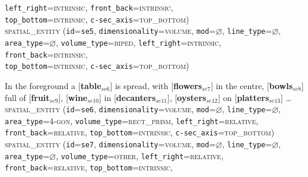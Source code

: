 \documentclass[11pt]{article}
\newcommand{\entity}[2]{[\textbf{\color{darkblue}#1}$_{se#2}$]}
\begin{document}
{            \texttt{left\_right}=\textsc{intrinsic},
            \texttt{front\_back}=\textsc{intrinsic},\\
            \texttt{top\_bottom}=\textsc{intrinsic},
            \texttt{c-sec\_axis}=\textsc{top\_bottom})\vspace{0.5em}\\
        \textsc{spatial\_entity}
            (\texttt{id}=\texttt{se5},
            \texttt{dimensionality}=\textsc{volume},
            \texttt{mod}=$\varnothing$,
            \texttt{line\_type}=$\varnothing$,\\
            \texttt{area\_type}=$\varnothing$,
            \texttt{volume\_type}=\textsc{biped},
            \texttt{left\_right}=\textsc{intrinsic},
            \texttt{front\_back}=\textsc{intrinsic},\\
            \texttt{top\_bottom}=\textsc{intrinsic},
            \texttt{c-sec\_axis}=\textsc{top\_bottom})        
        \label{ex:maurice_henriette}
    \item In the foreground a \entity{table}{6} is spread, with \entity{flowers}{7} in the centre, \entity{bowls}{8} full of \entity{fruit}{9}, \entity{wine}{10} in \entity{decanters}{11}, \entity{oysters}{12} on \entity{platters}{13} \ldots\vspace{0.5em}\\
        \textsc{spatial\_entity}
            (\texttt{id}=\texttt{se6},
            \texttt{dimensionality}=\textsc{volume},
            \texttt{mod}=$\varnothing$,
            \texttt{line\_type}=$\varnothing$,\\
            \texttt{area\_type}=\textsc{4-gon},
            \texttt{volume\_type}=\textsc{rect\_prism},
            \texttt{left\_right}=\textsc{relative},\\
            \texttt{front\_back}=\textsc{relative},
            \texttt{top\_bottom}=\textsc{intrinsic},
            \texttt{c-sec\_axis}=\textsc{top\_bottom})\vspace{0.5em}\\
        \textsc{spatial\_entity}
            (\texttt{id}=\texttt{se7},
            \texttt{dimensionality}=\textsc{volume},
            \texttt{mod}=$\varnothing$,
            \texttt{line\_type}=$\varnothing$,\\
            \texttt{area\_type}=$\varnothing$,
            \texttt{volume\_type}=\textsc{other},
            \texttt{left\_right}=\textsc{relative},\\
            \texttt{front\_back}=\textsc{relative},
            \texttt{top\_bottom}=\textsc{intrinsic},
}
\end{document}
